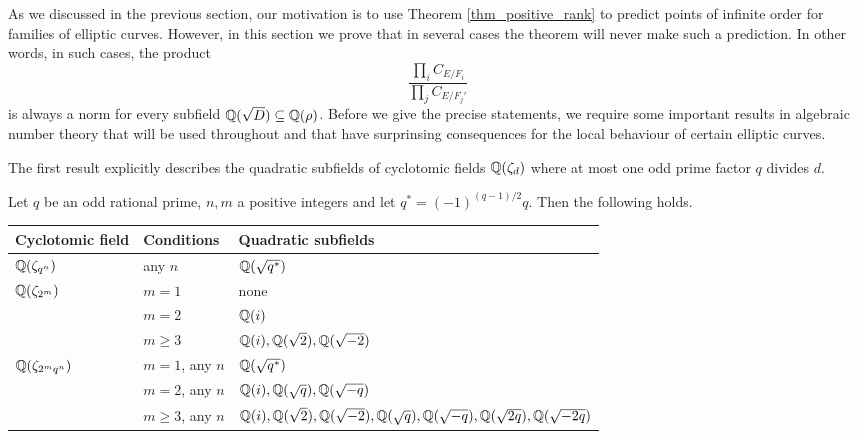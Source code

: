 As we discussed in the previous section, our motivation is to use Theorem \ref*{thm_positive_rank} to predict points of infinite order for families of elliptic curves. However, in this section we prove that in several cases the theorem will never make such a prediction. In other words, in such cases, the product
\begin{equation}\label{eqn_localprod}
    \frac{\prod_i C_{E/F_i}}{\prod_j C_{E/F_j'}}
\end{equation}
is always a norm for every subfield $\mathbb{Q}(\sqrt{D})\subseteq\mathbb{Q}(\rho)$. Before we give the precise statements, we require some important results in algebraic number theory that will be used throughout and that have surprinsing consequences for the local behaviour of certain elliptic curves. 



The first result explicitly describes the quadratic subfields of cyclotomic fields $\mathbb{Q}(\zeta_d)$ where at most one odd prime factor $q$ divides $d$.

\begin{lemma}\label{lem_subfields}
    Let $q$ be an odd rational prime, $n,m$ a positive integers and let $q^*=(-1)^{(q-1)/2}q$. Then the following holds.

    \begin{table}[!ht]
        \centering
        \begin{tabular}{|l|l|l|}
        \hline
        Cyclotomic field                    & Conditions & Quadratic subfields                   \\ \hline
        $\mathbb{Q}(\zeta_{q^n})$                  & any $n$    & $\mathbb{Q}(\sqrt{q^*})$            \\ \hline
        \multirow{3}{*}{$\mathbb{Q}(\zeta_{2^m})$} & $m=1$      & none                                  \\ \cline{2-3} 
                                            & $m=2$      & $\mathbb{Q}(i)$                              \\ \cline{2-3} 
                                            & $m\geq3$   & $\mathbb{Q}(i),\mathbb{Q}(\sqrt{2}),\mathbb{Q}(\sqrt{-2})$ \\ \hline
        \multirow{3}{*}{$\mathbb{Q}(\zeta_{2^mq^n})$}  & $m=1$, any $n$      & $\mathbb{Q}(\sqrt{q^*})$     \\ \cline{2-3} 
                                            & $m=2$, any $n$      & $\mathbb{Q}(i),\mathbb{Q}(\sqrt{q}),\mathbb{Q}(\sqrt{-q})$                              \\ \cline{2-3}
                                            & $m\geq 3$, any $n$      & $\mathbb{Q}(i),\mathbb{Q}(\sqrt{2}),\mathbb{Q}(\sqrt{-2}),\mathbb{Q}(\sqrt{q}),\mathbb{Q}(\sqrt{-q}),\mathbb{Q}(\sqrt{2q}),\mathbb{Q}(\sqrt{-2q})$                              \\ 
                                             \hline
        \end{tabular}
        \end{table}

\end{lemma}

